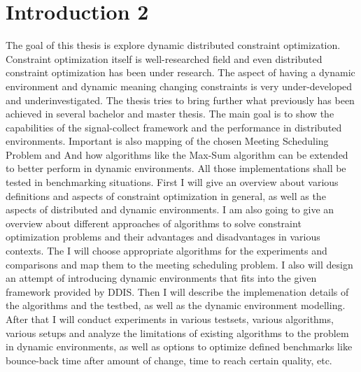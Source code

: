 \chapter{Introduction 2}

The goal of this thesis is explore dynamic distributed constraint optimization. Constraint optimization itself is well-researched field and even distributed constraint optimization has been under research. The aspect of having a dynamic environment and dynamic meaning changing constraints is very under-developed and underinvestigated.\newline
\newline
The thesis tries to bring further what previously has been achieved in several bachelor and master thesis. The main goal is to show the capabilities of the signal-collect framework and the performance in distributed environments. Important is also mapping of the chosen Meeting Scheduling Problem and And how algorithms like the Max-Sum algorithm can be extended to better perform in dynamic environments. All those implementations shall be tested in benchmarking situations.\newline
\newline
First I will give an overview about various definitions and aspects of constraint optimization in general, as well as the aspects of  distributed and dynamic environments. I am also going to give an overview about different approaches of algorithms to solve constraint optimization problems and their advantages and disadvantages in various contexts. The I will choose appropriate algorithms for the experiments and comparisons and map them to the meeting scheduling problem. I also will design an attempt of introducing dynamic environments that fits into the given framework provided by DDIS. Then I will describe the implemenation details of the algorithms and the testbed, as well as the  dynamic environment modelling. After that I will conduct experiments in various testsets, various algorithms, various setups and analyze the limitations of existing algorithms to the problem in dynamic environments, as well as options to optimize defined benchmarks like bounce-back time after amount of change, time to reach certain quality, etc.
